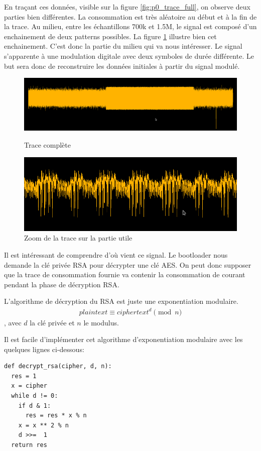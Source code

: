 \documentclass[14pt]{article}
\theoremstyle{definition}
\begin{document}
En traçant ces données, visible sur la figure \ref{fig:p0_trace_full}, on observe deux parties bien différentes. La consommation est très aléatoire au début et à la fin de la trace. Au milieu, entre les échantillons 700k et 1.5M, le signal est composé d'un enchainement de deux patterns possibles. La figure \ref{fig:p0_trace_zoom} illustre bien cet enchainement.
C'est donc la partie du milieu qui va nous intéresser. Le signal s'apparente à une modulation digitale avec deux symboles de durée différente. Le but sera donc de reconstruire les données initiales à partir du signal modulé.

\begin{figure}[H]
\centering
\includegraphics[width=1.0\textwidth]{./screenshots/current1.png}
  \caption{Trace complète}
  \label{fig:p0_trace_full}

\centering
\includegraphics[width=1.0\textwidth]{./screenshots/current1_zoom.png}
  \caption{Zoom de la trace sur la partie utile}
  \label{fig:p0_trace_zoom}
\end{figure}


Il est intéressant de comprendre d'où vient ce signal. Le bootloader nous demande la clé privée RSA pour décrypter une clé AES. On peut donc supposer que la trace de consommation fournie va contenir la consommation de courant pendant la phase de décryption RSA.


L'algorithme de décryption du RSA est juste une exponentiation modulaire.
\begin{align*}
  plaintext  \equiv ciphertext^d \pmod{n}
\end{align*}, avec $d$ la clé privée et $n$ le modulus.

Il est facile d'implémenter cet algorithme d'exponentiation modulaire avec les quelques lignes ci-dessous:
\begin{verbatim}
def decrypt_rsa(cipher, d, n):
  res = 1
  x = cipher
  while d != 0:
    if d & 1:
      res = res * x % n
    x = x ** 2 % n
    d >>=  1
  return res
\end{verbatim}
\end{document}
